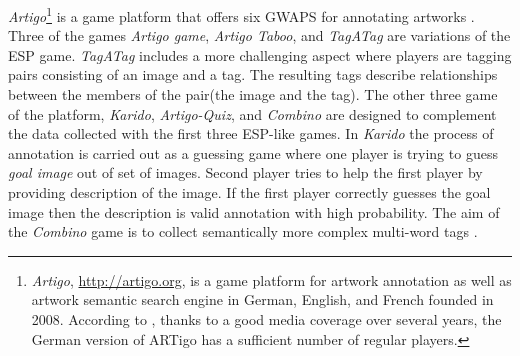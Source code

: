 \textit{Artigo}\footnote{\textit{Artigo}, \url{http://artigo.org}, is a game platform for artwork annotation as well as artwork semantic search engine in German, English, and French founded in 2008. According to \cite{PMS-FB-2015-1}, thanks to a good media coverage over several years, the German version of ARTigo has a sufficient number of regular players.} is a game platform that offers six GWAPS for annotating artworks \cite{PMS-FB-2013-3}. Three of the games \textit{Artigo game}, \textit{Artigo Taboo}, and \textit{TagATag} are variations of the ESP game. \textit{TagATag} includes a more challenging aspect where players are tagging pairs consisting of an image and a tag. The resulting tags describe relationships between the members of the pair(the image and the tag). The other three game of the platform, \textit{Karido}, \textit{Artigo-Quiz}, and \textit{Combino} are designed to complement the data collected with the first three ESP-like games. In \textit{Karido} \cite{DBLP:conf/cgames/SteinmayrWKB11} the process of annotation is carried out as a guessing game where one player is trying to guess  \textit{goal image} out of set of images. Second player tries to help the first player by providing description of the image. If the first player correctly guesses the goal image then the description is valid annotation with high probability. The aim of the \textit{Combino} game is to collect semantically more complex multi-word tags \cite{PA_Florian.Stoerkle}.
